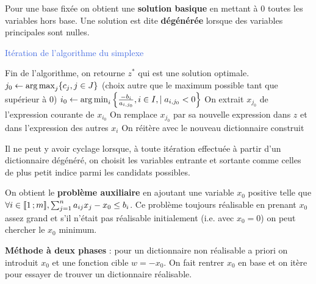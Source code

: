 Pour une base fixée on obtient une \textbf{solution basique} en mettant à $0$ toutes les variables hors base.
Une solution est dite \textbf{dégénérée} lorsque des variables principales sont nulles.

\begin{algorithm}[h]
	\caption{\textcolor{RoyalBlue}{Itération de l'algorithme du simplexe}}
	{
		Fin de l'algorithme, on retourne $z^*$ qui est une solution optimale.
	}
	\Sinon
	{
		$j_0 \leftarrow \operatorname{arg\, max}_j \{ c_j, j \in J \}$ (choix autre que le maximum possible tant que supérieur à $0$) \;
		$i_0 \leftarrow \operatorname{arg\, min}_i \left\{ \frac{- b_i}{a_{i,j_0}}, i \in I, \mid a_{i,j_0} < 0 \right\}$ \;
		On extrait $x_{j_0}$ de l'expression courante de $x_{i_0}$ \;
		On remplace $x_{j_0}$ par sa nouvelle expression dans $z$ et dans l'expression des autres $x_i$ \;
		On réitère avec le nouveau dictionnaire construit \;
	}
\end{algorithm}

\begin{thm}
	Il ne peut y avoir cyclage lorsque, à toute itération effectuée à partir d'un dictionnaire dégénéré, on choisit les variables entrante et sortante comme celles de plus petit indice parmi les candidats possibles.
\end{thm}

On obtient le \textbf{problème auxiliaire} en ajoutant une variable $x_0$ positive telle que $\forall i \in \mathopen{[\![}1\mathclose{}\mathpunct{};m\mathclose{]\!]}, \sum_{j = 1}^n a_{ij}x_j - x_0 \leq b_i$.
Ce problème toujours réalisable en prenant $x_0$ assez grand et s'il n'était pas réalisable initialement (i.e. avec $x_0 = 0$) on peut chercher le $x_0$ minimum.

\textbf{Méthode à deux phases} : pour un dictionnaire non réalisable a priori on introduit $x_0$ et une fonction cible $w = -x_0$. On fait rentrer $x_0$ en base et on itère pour essayer de trouver un dictionnaire réalisable.
